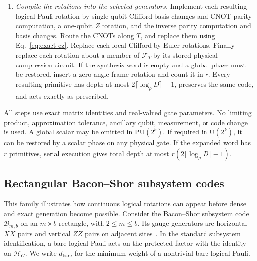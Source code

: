 \documentclass[aps,prl,reprint,notitlepage,nofootinbib,nobibnotes]{revtex4-2}
\newcommand{\HH}{\mathcal H}
\newcommand{\UU}{\mathrm U}
\newcommand{\PU}{\mathrm{PU}}
\newcommand{\id}{I}
\begin{document}
\begin{enumerate}
\begin{equation}
        \bigl(\id+(-1)^{y_j}\overline Z_j\bigr).
\end{equation}
For $A=\overline X_t$ or $\overline Z_t$ on the target outside $B$, the controlled rotation with
real parameter $\theta$ is $e^{i\theta\Pi_y A}$. Expanding the product in
Eq.~\eqref{eq:control-projector} expresses $\Pi_y A$ as a sum of mutually commuting Pauli strings,
hence its exponential is exactly the finite product of their rotations. Conditional phases
$e^{i\alpha\Pi_y}$ are handled by the same expansion. The adjacent transpositions are controlled
$X$ gates and use
\[
 (\id-\Pi_y)+\Pi_y\overline X_t
   =e^{\frac{i\pi\Pi_y}{2}}e^{-\frac{i\pi\Pi_y\overline X_t}{2}}.
\]
The final diagonal phases use Eq.~\eqref{eq:control-projector} with all logical bits in $B$. Thus
the phase of a two-level block is retained even when it is relative to the other basis states.
\item \emph{Compile the rotations into the selected generators.} Implement each resulting logical
Pauli rotation by single-qubit Clifford basis changes and CNOT parity computation, a one-qubit $Z$
rotation, and the inverse parity computation and basis changes. Route the CNOTs along $T$, and
replace them using Eq.~\eqref{eq:exact-cz}. Replace each local Clifford by Euler rotations. Finally
replace each rotation about a member of $\mathcal F_T$ by its stored physical compression circuit. If the synthesis word is empty and a global phase must be restored,
insert a zero-angle frame rotation and count it in $r$.
Every resulting primitive has depth at most $2\lceil\log_\rho D\rceil-1$, preserves the same code,
and acts exactly as prescribed.
\end{enumerate}
All steps use exact matrix identities and real-valued gate parameters. No limiting product,
approximation tolerance, ancillary qubit, measurement, or code change is used. A global scalar may
be omitted in $\PU(2^k)$. If required in $\UU(2^k)$, it can be restored by a scalar phase on any
physical gate. If the expanded word has $r$ primitives, serial execution gives total depth at most
$r(2\lceil\log_\rho D\rceil-1)$.

\subsection*{Rectangular Bacon--Shor subsystem codes}
\label{sm:bacon-shor}

This family illustrates how continuous logical rotations can appear before dense and exact
generation become possible. Consider the Bacon--Shor subsystem code $\mathcal B_{m,b}$ on an
$m\times b$ rectangle, with $2\le m\le b$. Its gauge generators are horizontal $XX$ pairs and
vertical $ZZ$ pairs on adjacent sites~\cite{Bacon,BaconCasaccino}. In the standard subsystem
identification, a bare logical Pauli acts on the protected factor with the identity on $\HH_G$. We
write $d_{\mathrm{bare}}$ for the minimum weight of a nontrivial bare logical Pauli.
\end{document}
